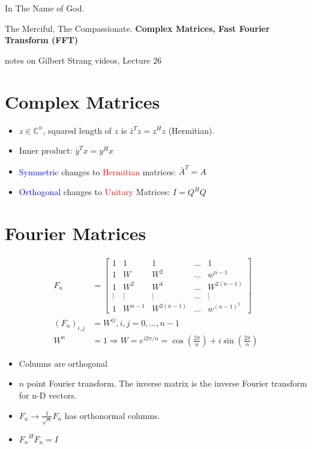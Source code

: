 \documentclass[a4paper,12pt]{article}
\newcommand{\blue}[1]{\textcolor{blue}{#1}}
\newcommand{\red}[1]{\textcolor{red}{#1}}
\theoremstyle{definition} \newtheorem{Theorem}{Theorem}
\begin{document}
\begin{center}
In The Name of God.

The Merciful, The Compassionate.
\vskip 1cm
{\Large\bfseries{Complex Matrices, Fast Fourier Transform (FFT) }}

\vskip 0.2cm
\tiny{notes on Gilbert Strang videos, Lecture 26}
\end{center}

\section{Complex Matrices}
\begin{itemize}
\item $z \in \mathbb{C}^n$, squared length of $z$ is $\bar{z}^T z = z^H z$ (Hermitian).
\item Inner product: $\bar{y}^T x = y^H x$
\item \blue{Symmetric} changes to \red{Hermitian} matrices: $\bar{A}^T = A$
\item \blue{Orthogonal} changes to \red{Unitary} Matrices: $I = Q^H Q$
\end{itemize}

\section{Fourier Matrices}
\begin{align*}
F_n &= \begin{bmatrix}
		1 	 & 1   	& 1   	& \ldots & 1 		\\
		1 	 & W   	& W^2 	& \ldots & w^{n-1}	\\
		1 	 & W^2 	& W^4 	& \ldots & W^{2(n-1)}	\\
		\vdots & \vdots	& \vdots	& \ldots & \vdots		\\
		1	 & W^{n-1}	& W^{2(n-1)}& \ldots & w^{(n-1)^2} 
\end{bmatrix} \\
(F_n)_{i,j} &= W^{ij}, i,j = 0,\ldots , n-1 \\
 W^n &= 1 \Rightarrow W = e^{i2\pi/n} = \cos(\frac{2\pi}{n}) + i\sin(\frac{2\pi}{n})
\end{align*}

\begin{itemize}
\item Columns are orthogonal 
\item $n$ point Fourier transform. The inverse matrix is the inverse Fourier transform for n-D vectors.
\item $F_n \rightarrow \frac{1}{\sqrt{n}}F_n$ has orthonormal columns.
\item ${F_n}^H F_n = I$
\end{itemize}
\end{document}
